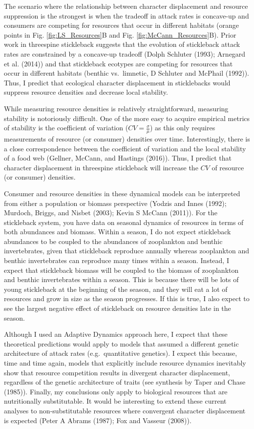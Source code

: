 \documentclass[11pt,]{article}
\begin{document}
The scenario where the relationship between character displacement and
resource suppression is the strongest is when the tradeoff in attack
rates is concave-up and consumers are competing for resources that occur
in different habitats (orange points in Fig. \ref{fig:LS_Resources}B and
Fig. \ref{fig:McCann_Resources}B). Prior work in threespine stickleback
suggests that the evolution of stickleback attack rates are constrained
by a concave-up tradeoff (Dolph Schluter (1993); Arnegard et al. (2014))
and that stickleback ecotypes are competing for resources that occur in
different habitats (benthic vs.~limnetic, D Schluter and McPhail
(1992)). Thus, I predict that ecological character displacement in
sticklebacks would suppress resource densities and decrease local
stability.

While measuring resource densities is relatively straightforward,
measuring stability is notoriously difficult. One of the more easy to
acquire empirical metrics of stability is the coefficient of variation
(\(CV=\frac{\sigma}{\mu}\)) as this only requires measurements of
resource (or consumer) densities over time. Interestingly, there is a
close correspondence between the coefficient of variation and the local
stability of a food web (Gellner, McCann, and Hastings (2016)). Thus, I
predict that character displacement in threespine stickleback will
increase the \(CV\) of resource (or consumer) densities.

Consumer and resource densities in these dynamical models can be
interpreted from either a population or biomass perspective (Yodzis and
Innes (1992); Murdoch, Briggs, and Nisbet (2003); Kevin S McCann
(2011)). For the stickleback system, you have data on seasonal dynamics
of resources in terms of both abundances and biomass. Within a season, I
do not expect stickleback abundances to be coupled to the abundances of
zooplankton and benthic invertebrates, given that stickleback reproduce
annually whereas zooplankton and benthic invertebrates can reproduce
many times within a season. Instead, I expect that stickleback biomass
will be coupled to the biomass of zooplankton and benthic invertebrates
within a season. This is because there will be lots of young stickleback
at the beginning of the season, and they will eat a lot of resources and
grow in size as the season progresses. If this is true, I also expect to
see the largest negative effect of stickleback on resource densities
late in the season.

Although I used an Adaptive Dynamics approach here, I expect that these
theoretical predictions would apply to models that assumed a different
genetic architecture of attack rates (e.g.~quantitative genetics). I
expect this because, time and time again, models that explicitly include
resource dynamics inevitably show that resource competition results in
divergent character displacement, regardless of the genetic architecture
of traits (see synthesis by Taper and Chase (1985)). Finally, my
conclusions only apply to biological resources that are nutritionally
substitutable. It would be interesting to extend these current analyses
to non-substitutable resources where convergent character displacement
is expected (Peter A Abrams (1987); Fox and Vasseur (2008)).
\end{document}
